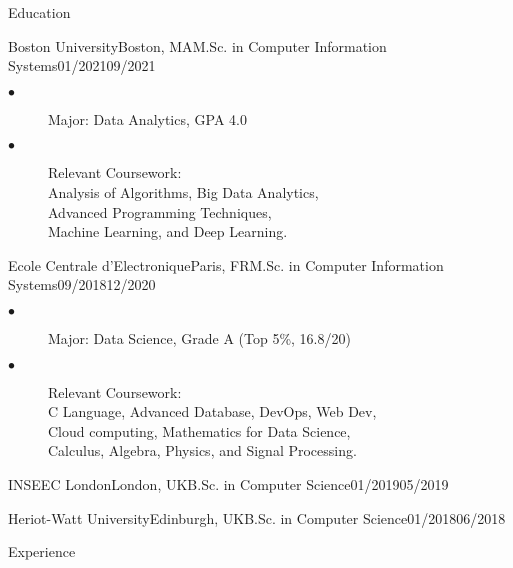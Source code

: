 \documentclass{resume}
\begin{document}
	\begin{multicols}{2}

	\begin{rSection}{\Large Education}
		\begin{school}{Boston University}{Boston, MA}{M.Sc. in Computer Information Systems}{01/2021}{09/2021}{
			\begin{description}
				\item[$\bullet$]Major:  Data Analytics, GPA 4.0
				\item[$\bullet$]{Relevant Coursework: \\
				Analysis of Algorithms, Big Data Analytics, \\
				Advanced Programming Techniques,  \\
				Machine Learning, and Deep Learning.}
			\end{description}
		}
		\end{school}
		
		\begin{school}{Ecole Centrale d'Electronique}{Paris, FR}{M.Sc. in Computer Information Systems}{09/2018}{12/2020}{
			\begin{description}
				\item[$\bullet$]Major: Data Science, Grade A  (Top 5\%, 16.8/20)
				\item[$\bullet$]{Relevant Coursework: \\
				C Language, Advanced Database, DevOps, Web Dev,\\
				Cloud computing, Mathematics for Data Science,\\
				Calculus, Algebra, Physics, and Signal Processing.}
			\end{description}
		}
		\end{school}
		\begin{school}{INSEEC London}{London, UK}{B.Sc. in Computer Science}{01/2019}{05/2019}{
		}
		\end{school}
		\begin{school}{Heriot-Watt University}{Edinburgh, UK}{B.Sc. in Computer Science}{01/2018}{06/2018}{
		}
		\end{school}
	\end{rSection}

	\begin{rSection}{\Large Experience}
	

\end{rSection}
\end{multicols}
\end{document}
